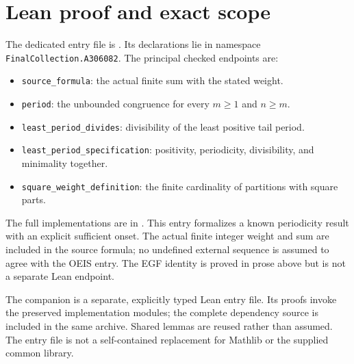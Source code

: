 \documentclass[11pt,a4paper]{article}
\theoremstyle{remark}
\begin{document}
\section{Lean proof and exact scope}
The dedicated entry file is . Its declarations lie in namespace \texttt{FinalCollection.A306082}. The principal checked endpoints are:
\begin{itemize}[nosep]
\item \texttt{source\_formula}: the actual finite sum with the stated weight.
\item \texttt{period}: the unbounded congruence for every $m\ge1$ and $n\ge m$.
\item \texttt{least\_period\_divides}: divisibility of the least positive tail period.
\item \texttt{least\_period\_specification}: positivity, periodicity, divisibility, and minimality together.
\item \texttt{square\_weight\_definition}: the finite cardinality of partitions with square parts.
\end{itemize}
The full implementations are in .
This entry formalizes a known periodicity result with an explicit sufficient onset. The actual finite integer weight and sum are included in the source formula; no undefined external sequence is assumed to agree with the OEIS entry. The EGF identity is proved in prose above but is not a separate Lean endpoint. 

The companion is a separate, explicitly typed Lean entry file. Its proofs
invoke the preserved implementation modules; the complete dependency source
is included in the same archive. Shared lemmas are reused rather than
assumed. The entry file is not a self-contained replacement for Mathlib or
the supplied common library.
\end{document}
